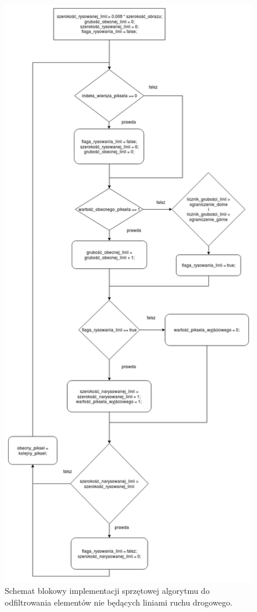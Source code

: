 \begin{figure}[!]
	\centering
	\includegraphics[scale=0.35]{impl_dev_lmps_2.png}
	\caption{Schemat blokowy implementacji sprzętowej algorytmu do odfiltrowania elementów nie będących liniami ruchu drogowego.}
	\label{fig:lmps2}
\end{figure}


